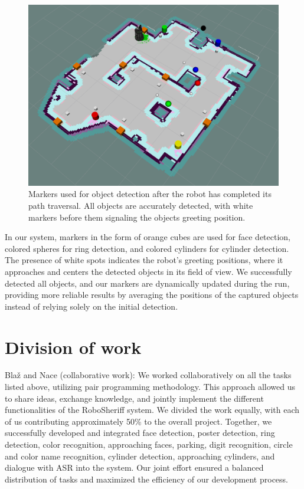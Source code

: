 \documentclass{article}
\begin{document}
\begin{figure}
  \centering
  \includegraphics[width=\textwidth]{images/markers.png}
  \caption{Markers used for object detection after the robot has completed its path traversal. All objects are accurately detected, with white markers before them signaling the objects greeting position.}
  \label{fig:markers}
\end{figure}

In our system, markers in the form of orange cubes are used for face detection, colored spheres for ring detection, and colored cylinders for cylinder detection. The presence of white spots indicates the robot's greeting positions, where it approaches and centers the detected objects in its field of view. We successfully detected all objects, and our markers are dynamically updated during the run, providing more reliable results by averaging the positions of the captured objects instead of relying solely on the initial detection.

\section{Division of work}

Blaž and Nace (collaborative work):
We worked collaboratively on all the tasks listed above, utilizing pair programming methodology. This approach allowed us to share ideas, exchange knowledge, and jointly implement the different functionalities of the RoboSheriff system. We divided the work equally, with each of us contributing approximately 50\% to the overall project. Together, we successfully developed and integrated face detection, poster detection, ring detection, color recognition, approaching faces, parking, digit recognition, circle and color name recognition, cylinder detection, approaching cylinders, and dialogue with ASR into the system. Our joint effort ensured a balanced distribution of tasks and maximized the efficiency of our development process.
\end{document}
